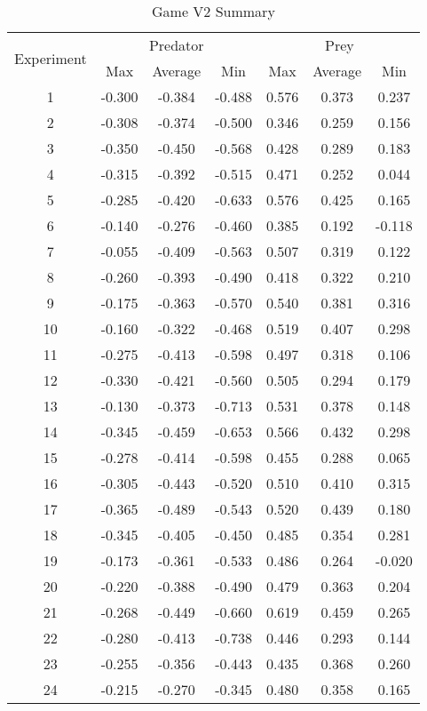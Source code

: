 \begin{table}
  \centering
  \begin{tabular}{|c|c|c|c|c|c|c|}
    \hline
    \multirow{2}{*}{Experiment} & \multicolumn{3}{|c|}{Predator} & \multicolumn{3}{|c|}{Prey} \\\cline{2-7}
    & Max & Average & Min & Max & Average & Min\\
    \hline
    1 & -0.300 & -0.384 & -0.488 & 0.576 & 0.373 & 0.237 \\
2 & -0.308 & -0.374 & -0.500 & 0.346 & 0.259 & 0.156 \\
3 & -0.350 & -0.450 & -0.568 & 0.428 & 0.289 & 0.183 \\
4 & -0.315 & -0.392 & -0.515 & 0.471 & 0.252 & 0.044 \\
5 & -0.285 & -0.420 & -0.633 & 0.576 & 0.425 & 0.165 \\
6 & -0.140 & -0.276 & -0.460 & 0.385 & 0.192 & -0.118 \\
7 & -0.055 & -0.409 & -0.563 & 0.507 & 0.319 & 0.122 \\
8 & -0.260 & -0.393 & -0.490 & 0.418 & 0.322 & 0.210 \\
9 & -0.175 & -0.363 & -0.570 & 0.540 & 0.381 & 0.316 \\
10 & -0.160 & -0.322 & -0.468 & 0.519 & 0.407 & 0.298 \\
11 & -0.275 & -0.413 & -0.598 & 0.497 & 0.318 & 0.106 \\
12 & -0.330 & -0.421 & -0.560 & 0.505 & 0.294 & 0.179 \\
13 & -0.130 & -0.373 & -0.713 & 0.531 & 0.378 & 0.148 \\
14 & -0.345 & -0.459 & -0.653 & 0.566 & 0.432 & 0.298 \\
15 & -0.278 & -0.414 & -0.598 & 0.455 & 0.288 & 0.065 \\
16 & -0.305 & -0.443 & -0.520 & 0.510 & 0.410 & 0.315 \\
17 & -0.365 & -0.489 & -0.543 & 0.520 & 0.439 & 0.180 \\
18 & -0.345 & -0.405 & -0.450 & 0.485 & 0.354 & 0.281 \\
19 & -0.173 & -0.361 & -0.533 & 0.486 & 0.264 & -0.020 \\
20 & -0.220 & -0.388 & -0.490 & 0.479 & 0.363 & 0.204 \\
21 & -0.268 & -0.449 & -0.660 & 0.619 & 0.459 & 0.265 \\
22 & -0.280 & -0.413 & -0.738 & 0.446 & 0.293 & 0.144 \\
23 & -0.255 & -0.356 & -0.443 & 0.435 & 0.368 & 0.260 \\
24 & -0.215 & -0.270 & -0.345 & 0.480 & 0.358 & 0.165 \\

    \hline
  \end{tabular}
  \caption{Game V2 Summary}
  \label{tab:v2-summary}
\end{table}


